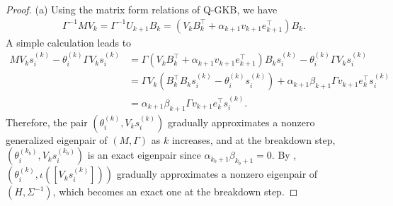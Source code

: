 \documentclass[10pt,a4paper]{amsart}
\begin{document}
\begin{proof}
  (a) Using the matrix form relations of Q-GKB, we have
  \begin{align*}
    \Gamma^{-1}MV_{k} = \Gamma^{-1}U_{k+1}B_{k}
    = (V_{k}B_{k}^{\top}+\alpha_{k+1}v_{k+1}e_{k+1}^{\top})B_{k}.
  \end{align*}
  A simple calculation leads to 
  \begin{align*}
    MV_{k}s_{i}^{(k)} - \theta_{i}^{(k)}\Gamma V_{k}s_{i}^{(k)}
    &= \Gamma(V_{k}B_{k}^{\top}+\alpha_{k+1}v_{k+1}e_{k+1}^{\top})B_{k}s_{i}^{(k)} - \theta_{i}^{(k)}\Gamma V_{k}s_{i}^{(k)} \\
    &= \Gamma V_{k}(B_{k}^{\top}B_{k}s_{i}^{(k)}-\theta_{i}^{(k)}s_{i}^{(k)}) + \alpha_{k+1}\beta_{k+1}\Gamma v_{k+1}e_{k}^{\top}s_{i}^{(k)} \\
    &= \alpha_{k+1}\beta_{k+1}\Gamma v_{k+1}e_{k}^{\top}s_{i}^{(k)}.
  \end{align*}
  Therefore, the pair $\left(\theta_{i}^{(k)}, V_{k}s_{i}^{(k)}\right)$ gradually approximates a nonzero generalized eigenpair of $(M,\Gamma)$ as $k$ increases, and at the breakdown step, $\left(\theta_{i}^{(k_b)}, V_{k}s_{i}^{(k_b)}\right)$ is an exact eigenpair since $\alpha_{k_b+1}\beta_{k_b+1}=0$. By , $\left(\theta_{i}^{(k)},\iota\left([V_{k}s_{i}^{(k)}]\right)\right)$ gradually approximates a nonzero eigenpair of $(H, \Sigma^{-1})$, which becomes an exact one at the breakdown step.


\end{proof}
\end{document}
